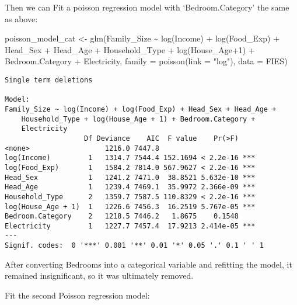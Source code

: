\documentclass[
]{article}
\newenvironment{Shaded}{\begin{snugshade}}{\end{snugshade}}
\newcommand{\AttributeTok}[1]{\textcolor[rgb]{0.40,0.45,0.13}{#1}}
\newcommand{\DecValTok}[1]{\textcolor[rgb]{0.68,0.00,0.00}{#1}}
\newcommand{\FunctionTok}[1]{\textcolor[rgb]{0.28,0.35,0.67}{#1}}
\newcommand{\NormalTok}[1]{\textcolor[rgb]{0.00,0.23,0.31}{#1}}
\newcommand{\OtherTok}[1]{\textcolor[rgb]{0.00,0.23,0.31}{#1}}
\newcommand{\SpecialCharTok}[1]{\textcolor[rgb]{0.37,0.37,0.37}{#1}}
\newcommand{\StringTok}[1]{\textcolor[rgb]{0.13,0.47,0.30}{#1}}
\begin{document}
Then we can Fit a poisson regression model with `Bedroom.Category' the
same as above:

\begin{Shaded}
\begin{Highlighting}[]
\NormalTok{poisson\_model\_cat }\OtherTok{\textless{}{-}} \FunctionTok{glm}\NormalTok{(Family\_Size }\SpecialCharTok{\textasciitilde{}} 
                       \FunctionTok{log}\NormalTok{(Income) }\SpecialCharTok{+}
                       \FunctionTok{log}\NormalTok{(Food\_Exp) }\SpecialCharTok{+}
\NormalTok{                       Head\_Sex }\SpecialCharTok{+}
\NormalTok{                       Head\_Age }\SpecialCharTok{+} 
\NormalTok{                       Household\_Type }\SpecialCharTok{+}
                       \FunctionTok{log}\NormalTok{(House\_Age}\SpecialCharTok{+}\DecValTok{1}\NormalTok{) }\SpecialCharTok{+}
\NormalTok{                       Bedroom.Category }\SpecialCharTok{+}
\NormalTok{                       Electricity, }
                     \AttributeTok{family =} \FunctionTok{poisson}\NormalTok{(}\AttributeTok{link =} \StringTok{"log"}\NormalTok{),}
                     \AttributeTok{data =}\NormalTok{ FIES) }
\end{Highlighting}
\end{Shaded}

\begin{verbatim}
Single term deletions

Model:
Family_Size ~ log(Income) + log(Food_Exp) + Head_Sex + Head_Age + 
    Household_Type + log(House_Age + 1) + Bedroom.Category + 
    Electricity
                   Df Deviance    AIC  F value    Pr(>F)    
<none>                  1216.0 7447.8                       
log(Income)         1   1314.7 7544.4 152.1694 < 2.2e-16 ***
log(Food_Exp)       1   1584.2 7814.0 567.9627 < 2.2e-16 ***
Head_Sex            1   1241.2 7471.0  38.8521 5.632e-10 ***
Head_Age            1   1239.4 7469.1  35.9972 2.366e-09 ***
Household_Type      2   1359.7 7587.5 110.8329 < 2.2e-16 ***
log(House_Age + 1)  1   1226.6 7456.3  16.2519 5.767e-05 ***
Bedroom.Category    2   1218.5 7446.2   1.8675    0.1548    
Electricity         1   1227.7 7457.4  17.9213 2.414e-05 ***
---
Signif. codes:  0 '***' 0.001 '**' 0.01 '*' 0.05 '.' 0.1 ' ' 1
\end{verbatim}

After converting Bedrooms into a categorical variable and refitting the
model, it remained insignificant, so it was ultimately removed.

Fit the second Poisson regression model:
\end{document}
